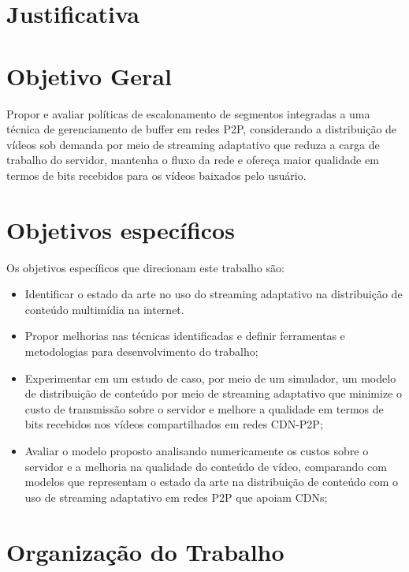 \documentclass[
	12pt,
	oneside,
	a4paper,
	english,
	brazil
	]{abntex2ppgsi}
\begin{document}
\section{Justificativa}


\section{Objetivo Geral}

Propor e avaliar políticas de escalonamento de segmentos integradas a uma técnica de gerenciamento de buffer em redes P2P, considerando a distribuição de vídeos sob demanda por meio de streaming adaptativo que reduza a carga de trabalho do servidor, mantenha o fluxo da rede e ofereça maior qualidade em termos de bits recebidos para os vídeos baixados pelo usuário.


\section{Objetivos específicos}

Os objetivos específicos que direcionam este trabalho são:

\begin{itemize}
\item	Identificar o estado da arte no uso do streaming adaptativo na distribuição de conteúdo multimídia na internet.
\item 	Propor melhorias nas técnicas identificadas e definir ferramentas e metodologias para desenvolvimento do trabalho;
\item 	Experimentar em um estudo de caso, por meio de um simulador, um modelo de distribuição de conteúdo por meio de streaming adaptativo que minimize o custo de transmissão sobre o servidor e melhore a qualidade em termos de bits recebidos nos vídeos compartilhados em redes CDN-P2P;
\item 	Avaliar o modelo proposto analisando numericamente os custos sobre o servidor e a melhoria na qualidade do conteúdo de vídeo, comparando com modelos que representam o estado da arte na distribuição de conteúdo com o uso de streaming adaptativo em redes P2P que apoiam CDNs;
\end{itemize}

\section{Organização do Trabalho}
\end{document}
